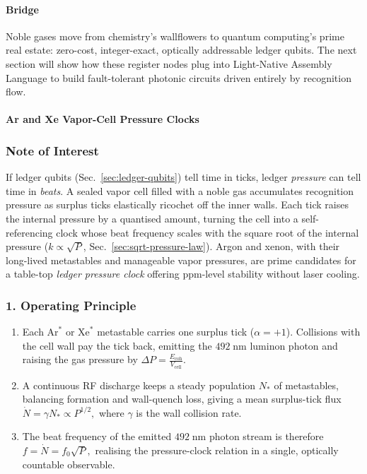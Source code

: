 \documentclass[11pt,oneside]{book}
\begin{document}
\paragraph*{Bridge}

Noble gases move from chemistry’s wallflowers to quantum computing’s
prime real estate: zero-cost, integer-exact, optically addressable
ledger qubits.
The next section will show how these register nodes plug into
Light-Native Assembly Language to build fault-tolerant photonic circuits
driven entirely by recognition flow.

\bigskip

\paragraph{Ar and Xe Vapor-Cell Pressure Clocks}
\label{sec:pressure-clocks}

\subsubsection*{Note of Interest}

If ledger qubits (Sec.~\ref{sec:ledger-qubits}) tell time in ticks,
ledger \emph{pressure} can tell time in \textit{beats}.
A sealed vapor cell filled with a noble gas accumulates recognition
pressure as surplus ticks elastically ricochet off the inner walls.
Each tick raises the internal pressure by a quantised amount, turning the
cell into a self-referencing clock whose beat frequency scales with the
square root of the internal pressure
($k\!\propto\!\sqrt P$, Sec.~\ref{sec:sqrt-pressure-law}).
Argon and xenon, with their long-lived metastables and manageable vapor
pressures, are prime candidates for a table-top \emph{ledger pressure
clock} offering ppm-level stability without laser cooling.

\subsubsection*{1. Operating Principle}

\begin{enumerate}[label=\textbf{\arabic*.},leftmargin=1.2cm]
\item Each $\mathrm{Ar}^*$ or $\mathrm{Xe}^*$ metastable carries one
      surplus tick ($\alpha = +1$).  
      Collisions with the cell wall pay the tick back, emitting the
      $492\;\text{nm}$ luminon photon and raising the gas pressure by
      $\Delta P = \frac{E_{\text{coh}}}{V_{\text{cell}}}$.
\item A continuous RF discharge keeps a steady population $N_\ast$ of
      metastables, balancing formation and wall-quench loss, giving a
      mean surplus-tick flux
      \(
         \dot N
         = \gamma N_\ast
         \propto P^{1/2},
      \)
      where $\gamma$ is the wall collision rate.
\item The beat frequency of the emitted $492\;\text{nm}$ photon stream is
      therefore
      \(
         f
         = \dot N
         = f_0\sqrt{P},
      \)
      realising the pressure-clock relation in a single, optically
      countable observable.
\end{enumerate}
\end{document}
